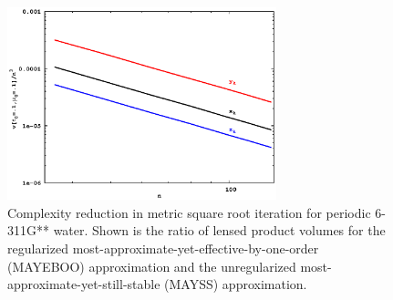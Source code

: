 \documentclass[letterpaper,twocolumn,amsmath,amsfont,amssymb,english,aps,jcp,preprintnumbers,groupaddress,nofootinbib,tightenlines,floatfix]{revtex4}
\theoremstyle{plain}
\theoremstyle{remark}
\theoremstyle{plain}
\begin{document}
\begin{figure}[tb] 
\includegraphics[width=7.8cm,keepaspectratio=true,trim={0.cm 0.cm 0.cm 0.cm},clip]
                 {fig_33_tube_cond_10_regularized_volume_vs_n3_tubes.eps} 
\caption{ 
Complexity reduction in metric square root iteration for periodic 6-311G** water. 
Shown is the ratio of lensed product volumes for the regularized most-approximate-yet-effective-by-one-order (MAYEBOO) 
approximation and the unregularized most-approximate-yet-still-stable (MAYSS) approximation.}\label{Complex2}
\end{figure}
\end{document}
